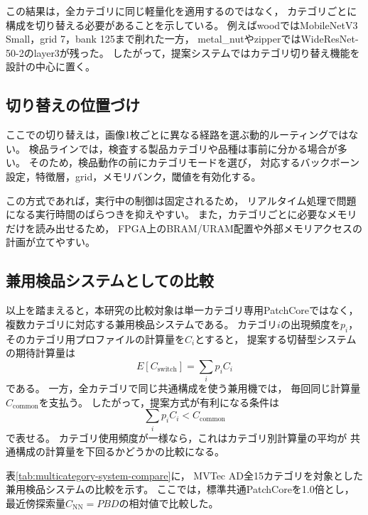 \documentclass[uplatex,dvipdfmx,a4paper,11pt]{jsarticle}
\begin{document}
この結果は，全カテゴリに同じ軽量化を適用するのではなく，
カテゴリごとに構成を切り替える必要があることを示している。
例えばwoodではMobileNetV3 Small，grid 7，bank 125まで削れた一方，
metal\_nutやzipperではWideResNet-50-2のlayer3が残った。
したがって，提案システムではカテゴリ切り替え機能を設計の中心に置く。

\subsection{切り替えの位置づけ}

ここでの切り替えは，画像1枚ごとに異なる経路を選ぶ動的ルーティングではない。
検品ラインでは，検査する製品カテゴリや品種は事前に分かる場合が多い。
そのため，検品動作の前にカテゴリモードを選び，
対応するバックボーン設定，特徴層，grid，メモリバンク，閾値を有効化する。

この方式であれば，実行中の制御は固定されるため，
リアルタイム処理で問題になる実行時間のばらつきを抑えやすい。
また，カテゴリごとに必要なメモリだけを読み出せるため，
FPGA上のBRAM/URAM配置や外部メモリアクセスの計画が立てやすい。

\subsection{兼用検品システムとしての比較}

以上を踏まえると，本研究の比較対象は単一カテゴリ専用PatchCoreではなく，
複数カテゴリに対応する兼用検品システムである。
カテゴリ$i$の出現頻度を$p_i$，そのカテゴリ用プロファイルの計算量を$C_i$とすると，
提案する切替型システムの期待計算量は
\[
  E[C_{\mathrm{switch}}] = \sum_i p_i C_i
\]
である。
一方，全カテゴリで同じ共通構成を使う兼用機では，
毎回同じ計算量$C_{\mathrm{common}}$を支払う。
したがって，提案方式が有利になる条件は
\[
  \sum_i p_i C_i < C_{\mathrm{common}}
\]
で表せる。
カテゴリ使用頻度が一様なら，これはカテゴリ別計算量の平均が
共通構成の計算量を下回るかどうかの比較になる。

表\ref{tab:multicategory-system-compare}に，
MVTec AD全15カテゴリを対象とした兼用検品システムの比較を示す。
ここでは，標準共通PatchCoreを1.0倍とし，
最近傍探索量$C_{\mathrm{NN}} = PBD$の相対値で比較した。
\end{document}
